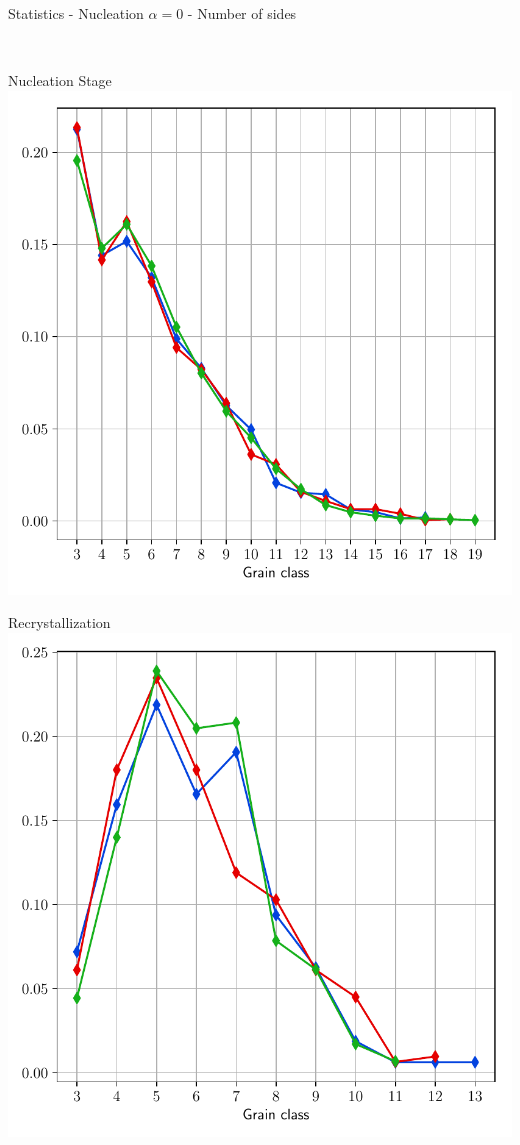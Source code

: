 \documentclass[usenames,dvipsnames]{beamer}
\begin{document}
\begin{frame}{Statistics - Nucleation $\alpha = 0$ - Number of sides}
\begin{minipage}{0.5\textwidth}
    \end{minipage}\\
    \begin{minipage}{0.5\textwidth}
    \centering
    \scriptsize
    Nucleation Stage
    \includegraphics[trim={0 1em 0 1.1em},clip=true,scale=0.335]{figures/stored_energy/SE/nsides/000110_nuclconstant_set.pdf}
    \end{minipage}%
    \begin{minipage}{0.5\textwidth}
    \centering
    \scriptsize
    Recrystallization
    \includegraphics[trim={0 1em 0 1.1em},clip=true,scale=0.335]{figures/stored_energy/SE/nsides/000240_nuclconstant_set.pdf}
    \end{minipage}
\end{frame}
\end{document}
